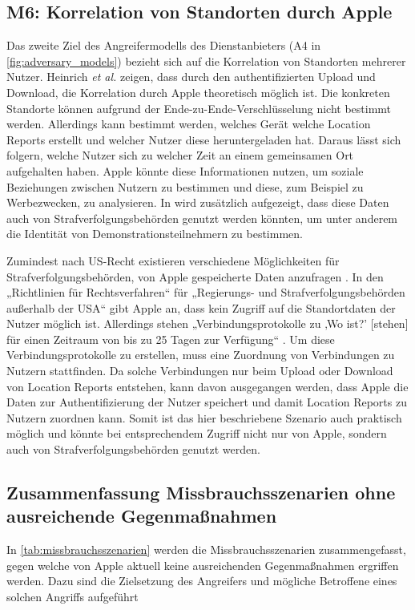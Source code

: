 \subsection[M6]{M6: Korrelation von Standorten durch Apple}
\label{missbrauch:6}

Das zweite Ziel des Angreifermodells des Dienstanbieters (A4 in \autoref{fig:adversary_models}) bezieht sich auf die Korrelation von Standorten mehrerer Nutzer.
Heinrich \textit{et al.} \cite{Heinrich_FindMy} zeigen, dass durch den authentifizierten Upload und Download, die Korrelation durch Apple theoretisch möglich ist.
Die konkreten Standorte können aufgrund der Ende-zu-Ende-Verschlüsselung nicht bestimmt werden.
Allerdings kann bestimmt werden, welches Gerät welche Location Reports erstellt und welcher Nutzer diese heruntergeladen hat.
Daraus lässt sich folgern, welche Nutzer sich zu welcher Zeit an einem gemeinsamen Ort aufgehalten haben.
Apple könnte diese Informationen nutzen, um soziale Beziehungen zwischen Nutzern zu bestimmen und diese, zum Beispiel zu Werbezwecken, zu analysieren.
In \cite{Heinrich_FindMy} wird zusätzlich aufgezeigt, dass diese Daten auch von Strafverfolgungsbehörden genutzt werden könnten, um unter anderem die Identität von Demonstrationsteilnehmern zu bestimmen.

Zumindest nach US-Recht existieren verschiedene Möglichkeiten für Strafverfolgungsbehörden, von Apple gespeicherte Daten anzufragen \cite{Data_Access}.
In den „Richtlinien für Rechtsverfahren“ für „Regierungs- und Strafverfolgungsbehörden außerhalb der USA“ \cite{Apple_FindMy_Data} gibt Apple an, dass kein Zugriff auf die Standortdaten der Nutzer möglich ist.
Allerdings stehen „Verbindungsprotokolle zu ‚Wo ist?’ [stehen] für einen Zeitraum von bis zu 25 Tagen zur Verfügung“ \cite{Apple_FindMy_Data}.
Um diese Verbindungsprotokolle zu erstellen, muss eine Zuordnung von Verbindungen zu Nutzern stattfinden.
Da solche Verbindungen nur beim Upload oder Download von Location Reports entstehen, kann davon ausgegangen werden, dass Apple die Daten zur Authentifizierung der Nutzer speichert und damit Location Reports zu Nutzern zuordnen kann.
Somit ist das hier beschriebene Szenario auch praktisch möglich und könnte bei entsprechendem Zugriff nicht nur von Apple, sondern auch von Strafverfolgungsbehörden genutzt werden.



\subsection{Zusammenfassung Missbrauchsszenarien ohne ausreichende Gegenmaßnahmen}
In \autoref{tab:missbrauchsszenarien} werden die Missbrauchsszenarien zusammengefasst, gegen welche von Apple aktuell keine ausreichenden Gegenmaßnahmen ergriffen werden.
Dazu sind die Zielsetzung des Angreifers und mögliche Betroffene eines solchen Angriffs aufgeführt

